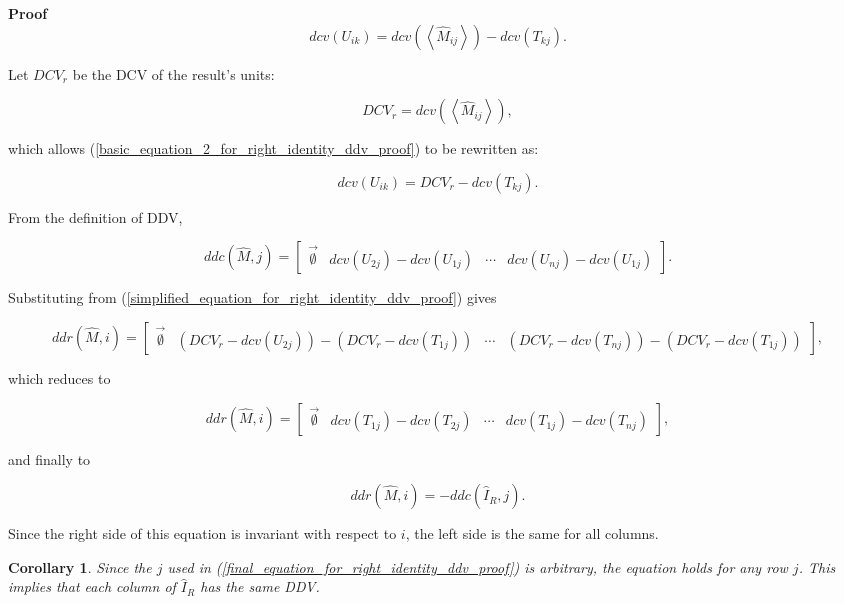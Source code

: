 \documentclass[10pt,letterpaper]{article}
\newtheorem{cor}{Corollary}[section]
\newenvironment{proof}{\noindent\textbf{Proof} }{\qed \newline}
\newcommand{\qed}{\nobreak \ifvmode \relax \else
      \ifdim\lastskip<1.5em \hskip-\lastskip
      \hskip1.5em plus0em minus0.5em \fi \nobreak
      \vrule height0.75em width0.5em depth0.25em\fi}
\numberwithin{equation}{section}
\begin{document}
\begin{proof}
\begin{equation} \label{basic_equation_2_for_right_identity_ddv_proof} dcv(U_{ik}) = dcv( \left\langle \hat M_{ij} \right\rangle ) - dcv(T_{kj}). \end{equation}

Let $DCV_r$ be the DCV of the result's units:

\[ DCV_r = dcv( \left\langle \hat M_{ij} \right\rangle ) , \]

which allows (\ref{basic_equation_2_for_right_identity_ddv_proof}) to be rewritten as:

\begin{equation} \label{simplified_equation_for_right_identity_ddv_proof} dcv(U_{ik}) = DCV_r - dcv(T_{kj}) . \end{equation}

From the definition of DDV,

\[ ddc(\hat M, j) = \left[ \begin{matrix} \vec{\emptyset} & dcv(U_{2j}) - dcv(U_{1j}) & \cdots & dcv(U_{nj}) - dcv(U_{1j}) \end{matrix} \right] . \]

Substituting from (\ref{simplified_equation_for_right_identity_ddv_proof}) gives

\[ ddr(\hat M, i) = \left[ \begin{matrix} \vec{\emptyset} & (DCV_r - dcv(U_{2j})) - (DCV_r - dcv(T_{1j})) & \cdots & (DCV_r - dcv(T_{nj})) - (DCV_r - dcv(T_{1j})) \end{matrix} \right] , \]

which reduces to

\[ ddr(\hat M, i) = \left[ \begin{matrix} \vec{\emptyset} & dcv(T_{1j}) - dcv(T_{2j}) & \cdots & dcv(T_{1j}) - dcv(T_{nj}) \end{matrix} \right] , \]

and finally to

\begin{equation} \label{final_equation_for_right_identity_ddv_proof} ddr(\hat M, i) = -ddc(\hat I_R, j) . \end{equation} 

Since the right side of this equation is invariant with respect to $i$, the left side is the same for all columns. \end{proof}

\begin{cor}Since the $j$ used in (\ref{final_equation_for_right_identity_ddv_proof}) is arbitrary, the equation holds for any row $j$.  This implies that each column of $\hat I_R$ has the same DDV.\end{cor}
\end{document}

